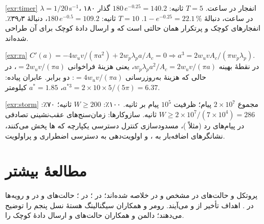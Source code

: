 \documentclass[11pt,a4paper]{article}
\begin{document}
\begin{solutionbox}{\ref{exr:timer}}
$\lambda = 1/20$\,s$^{-1}$، ۱۸۰ انفجار در ساعت. $T = 5$ ثانیه: $180\,e^{-0.25} = 140.2$ گذار در ساعت، دنبالهٔ $1 - e^{-0.25} = 22.1\,\%$. $T = 10$ ثانیه:
$180\,e^{-0.5} = 109.2$، دنبالهٔ ۳۹٫۳٪. انفجارهای کوچک و پرتکرار همان حالتی است که  و ارسال دادهٔ کوچک برای آن طراحی شده‌اند.
\end{solutionbox}

\begin{solutionbox}{\ref{exr:ra}}
$C'(a) = -4w_uv/(\pi a^2) + 2w_p\lambda_p a/A_c = 0 \Rightarrow a^3 = 2w_uvA_c/(\pi w_p\lambda_p)$. در نقطهٔ بهینه $w_p\lambda_p a^2/A_c = 2w_uv/(\pi a)$، یعنی هزینهٔ
فراخوانی $= 2w_uv/(\pi a)$، در حالی که هزینهٔ به‌روزرسانی $= 4w_uv/(\pi a)$: دو برابر. عابران پیاده: $a^{*3} = 2\times10\times5/(5\pi) = 6.37$، $a^{*} = 1.85$ کیلومتر.
\end{solutionbox}

\begin{solutionbox}{\ref{exr:storm}}
مجموع $2\times10^{7}$ پیام؛ ظرفیت $10^{5}$ پیام بر ثانیه. ۱۰۰٪: $W \ge 200$ ثانیه؛ ۷۰٪: $W \ge 2\times10^{7}/(7\times10^{4}) = 286$ ثانیه. سازوکارها: زمان‌سنج‌های
عقب‌نشینی تصادفی در پیام‌های رد  (مثلاً )، مسدودسازی کنترل دسترسی یکپارچه که ها پخش می‌کنند، نشانگرهای اضافه‌بار 
به ، و اولویت‌دهی به دسترسی اضطراری و پراولویت.
\end{solutionbox}

\section{مطالعهٔ بیشتر}
پروتکل و حالت‌های  در  \cite{ts38331} مشخص و در  \cite{ts38300} خلاصه شده‌اند؛  در  \cite{ts24501}؛
 در  \cite{ts38413}؛ حالت‌های  و  در  \cite{ts23501} و رویه‌ها در  \cite{ts23502}. اهداف تأخیر از
 \cite{tr38913} و  \cite{itu2017m2410} می‌آیند. رومر و همکاران \cite{rommer2020core} سیگنالینگ هستهٔ نسل پنجم را توضیح می‌دهند؛
دالمن و همکاران \cite{dahlman2020nr} حالت‌های  و ارسال دادهٔ کوچک را.

\begin{latin}
\printbibliography[heading=subbibliography,title={References}]
\end{latin}
\end{document}
